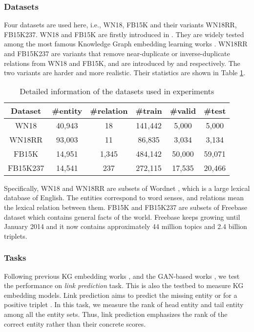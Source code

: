 \documentclass[conference]{IEEEtran}
\begin{document}
\subsubsection{Datasets}
{
Four datasets are used here,
i.e., WN18, FB15K and their variants WN18RR, FB15K237.
WN18 and FB15K are firstly introduced in \cite{bordes2013translating}.
They are widely tested among the most famous Knowledge Graph embedding learning works
\cite{bordes2013translating,ji2015knowledge,trouillon2016complex,wang2018incorporating,cai2018kbgan}. 
WN18RR and FB15K237 are variants that remove near-duplicate or inverse-duplicate relations from WN18 and FB15K, and are introduced by \cite{wang2018evaluating} and  \cite{toutanova2015observed} respectively.
The two variants are harder and more realistic.
Their statistics are shown in Table \ref{tb-dataset}.
}


\begin{table}[ht]
	\centering
\caption{Detailed information of the datasets used in experiments}
	\label{tb-dataset}
\begin{tabular}{c|ccccc}
		\hline
		Dataset & \#entity & \#relation & \#train & \#valid & \#test \\ 
		\hline
		WN18 & 40,943 & 18 & 141,442 & 5,000 & 5,000 \\
		WN18RR & 93,003 & 11 & 86,835 & 3,034 & 3,134 \\
		FB15K & 14,951 & 1,345 & 484,142 & 50,000 & 59,071 \\
		FB15K237 & 14,541 & 237 & 272,115 & 17,535 & 20,466 \\
		\hline 
	\end{tabular}
\end{table}

Specifically,
WN18 and WN18RR are subsets of Wordnet \cite{miller1995wordnet}, which is a large lexical database of English. The entities correspond to word senses, and relations mean the lexical relation between them.
FB15K and FB15K237 are subsets of Freebase dataset \cite{bollacker2008freebase} which contains general facts of the world.
Freebase keeps growing until January 2014 and it now contains approximately 44 million topics and 2.4 billion triplets. 

\subsubsection{Tasks}
{Following previous KG embedding works \cite{bordes2013translating,wang2014knowledge,ji2015knowledge,trouillon2016complex}, 
	and the GAN-based works \cite{wang2018incorporating,cai2018kbgan}, 
	we test the performance on \emph{link prediction} task. 
	This is also the testbed to measure KG embedding models.}
Link prediction aims to predict the missing entity  or  for a positive triplet . 
In this task, we measure the rank of head entity  and tail entity  among all the entity sets.
Thus, link prediction emphasizes the rank of the correct entity 
rather than their concrete scores.
\end{document}
